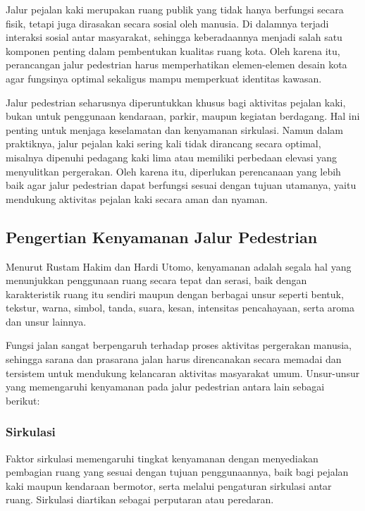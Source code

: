 \documentclass[../rumukota.tex]{subfiles}
\begin{document}
Jalur pejalan kaki merupakan ruang publik yang tidak hanya berfungsi secara fisik, tetapi juga dirasakan secara sosial oleh manusia. Di dalamnya terjadi interaksi sosial antar masyarakat, sehingga keberadaannya menjadi salah satu komponen penting dalam pembentukan kualitas ruang kota. Oleh karena itu, perancangan jalur pedestrian harus memperhatikan elemen-elemen desain kota agar fungsinya optimal sekaligus mampu memperkuat identitas kawasan.

Jalur pedestrian seharusnya diperuntukkan khusus bagi aktivitas pejalan kaki, bukan untuk penggunaan kendaraan, parkir, maupun kegiatan berdagang. Hal ini penting untuk menjaga keselamatan dan kenyamanan sirkulasi. Namun dalam praktiknya, jalur pejalan kaki sering kali tidak dirancang secara optimal, misalnya dipenuhi pedagang kaki lima atau memiliki perbedaan elevasi yang menyulitkan pergerakan. Oleh karena itu, diperlukan perencanaan yang lebih baik agar jalur pedestrian dapat berfungsi sesuai dengan tujuan utamanya, yaitu mendukung aktivitas pejalan kaki secara aman dan nyaman.

\subsection{Pengertian Kenyamanan Jalur Pedestrian}%
\label{sub:pengertian_kenyamanan_jalur_pedestrian}

Menurut Rustam Hakim dan Hardi Utomo, kenyamanan adalah segala hal yang menunjukkan penggunaan ruang secara tepat dan serasi, baik dengan karakteristik ruang itu sendiri maupun dengan berbagai unsur seperti bentuk, tekstur, warna, simbol, tanda, suara, kesan, intensitas pencahayaan, serta aroma dan unsur lainnya.

Fungsi jalan sangat berpengaruh terhadap proses aktivitas pergerakan manusia, sehingga sarana dan prasarana jalan harus direncanakan secara memadai dan tersistem untuk mendukung kelancaran aktivitas masyarakat umum. Unsur-unsur yang memengaruhi kenyamanan pada jalur pedestrian antara lain sebagai berikut:

\subsubsection{Sirkulasi}%
\label{ssub:sirkulasi}


Faktor sirkulasi memengaruhi tingkat kenyamanan dengan menyediakan pembagian ruang yang sesuai dengan tujuan penggunaannya, baik bagi pejalan kaki maupun kendaraan bermotor, serta melalui pengaturan sirkulasi antar ruang. Sirkulasi diartikan sebagai perputaran atau peredaran.
\end{document}

